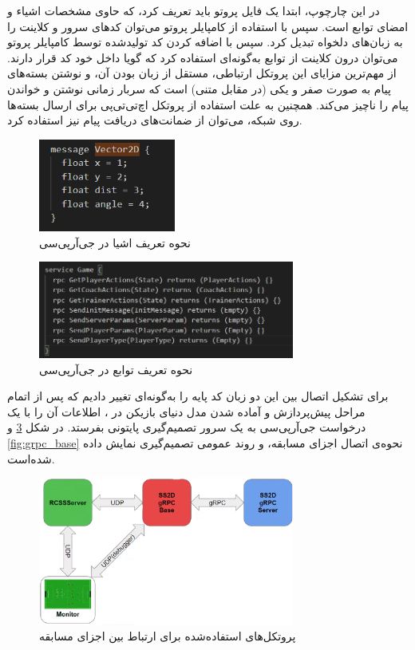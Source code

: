 در این چارچوپ، ابتدا یک فایل پروتو  
باید تعریف کرد، که حاوی مشخصات اشیاء و امضای توابع است. سپس با استفاده از کامپایلر پروتو می‌توان کد‌های سرور و کلاینت را به زبان‌های دلخواه تبدیل کرد.
سپس با اضافه کردن کد تولید‌شده توسط کامپایلر پروتو می‌توان درون کلاینت از توابع به‌گونه‌ای استفاده کرد که گویا داخل خود کد قرار دارند. از مهم‌ترین مزایای
این پروتکل ارتباطی، مستقل از زبان بودن آن، و نوشتن بسته‌های پیام به صورت صفر و یکی (در مقابل متنی)  است که سربار زمانی نوشتن و خواندن پیام را ناچیز می‌کند.
همچنین به علت استفاده از پروتکل اچ‌تی‌تی‌پی  برای ارسال بسته‌ها روی شبکه، 
می‌توان از ضمانت‌های دریافت پیام نیز استفاده کرد.
\begin{figure}[H]
    \centering
    \includegraphics[width=0.4\textwidth]{images/grpc_message.png}
    \caption{نحوه تعریف اشیا در جی‌آر‌پی‌سی}\label{fig:grpc_message}
\end{figure}
\begin{figure}[H]
    \centering
    \includegraphics[width=0.75\textwidth]{images/grpc_service.png}
    \caption{نحوه تعریف توابع در جی‌آر‌پی‌سی}\label{fig:grpc_service}
\end{figure}

برای تشکیل اتصال بین این دو زبان کد پایه  را به‌گونه‌ای تغییر دادیم که
پس از اتمام مراحل پیش‌پردازش و آماده شدن مدل دنیای بازیکن
در ،
اطلاعات آن را با یک درخواست جی‌آرپی‌سی
به یک سرور تصمیم‌گیری پایتونی بفرستد.
در شکل \ref{fig:connection} و \ref{fig:grpc_base}
نحوه‌ی اتصال اجزای مسابقه، و روند عمومی تصمیم‌گیری نمایش داده شده‌است.

\begin{figure}[H]
    \centering
    \includegraphics[width=0.75\textwidth]{images/connection_protocols.png}
    \caption{پروتکل‌های استفاده‌شده برای ارتباط بین اجزای مسابقه}\label{fig:connection}
    
\end{figure}

